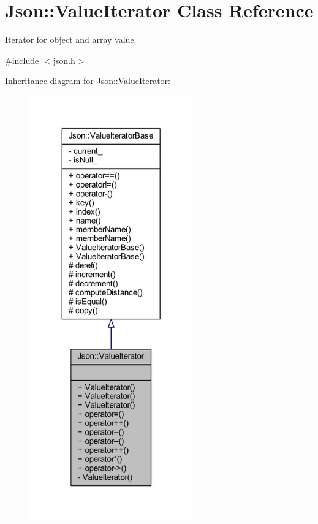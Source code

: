 \hypertarget{class_json_1_1_value_iterator}{}\section{Json\+:\+:Value\+Iterator Class Reference}
\label{class_json_1_1_value_iterator}


Iterator for object and array value.  




{\ttfamily \#include $<$json.\+h$>$}



Inheritance diagram for Json\+:\+:Value\+Iterator\+:\nopagebreak
\begin{figure}[H]
\begin{center}
\leavevmode
\includegraphics[width=200pt]{class_json_1_1_value_iterator__inherit__graph}
\end{center}
\end{figure}


